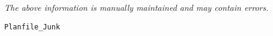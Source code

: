\label{pkg:planfile\_junk}

{\tiny \it The above information is manually maintained and may contain errors.}
\begin{verbatim}
Planfile_Junk
\end{verbatim}

